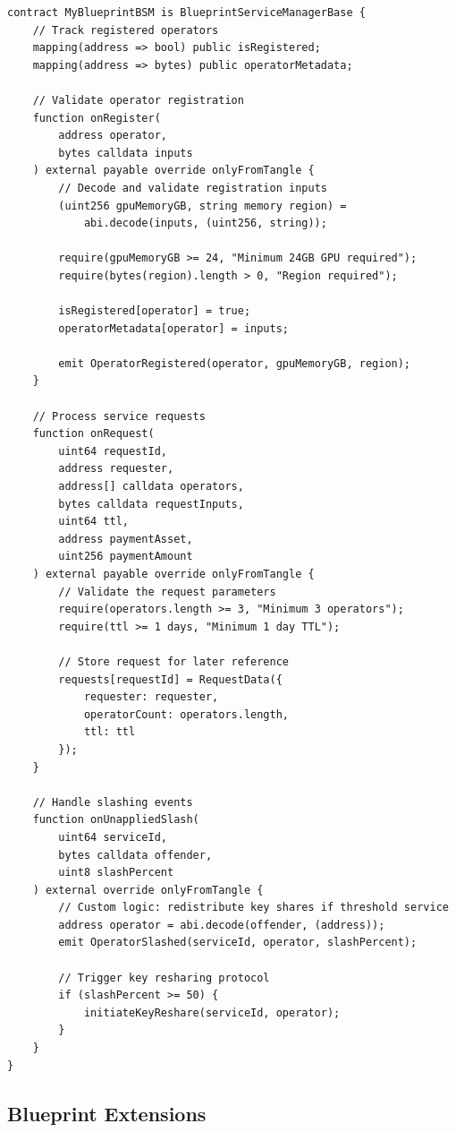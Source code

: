 \documentclass[11pt,a4paper]{article}
\begin{document}
\begin{lstlisting}[style=solidity]
contract MyBlueprintBSM is BlueprintServiceManagerBase {
    // Track registered operators
    mapping(address => bool) public isRegistered;
    mapping(address => bytes) public operatorMetadata;

    // Validate operator registration
    function onRegister(
        address operator,
        bytes calldata inputs
    ) external payable override onlyFromTangle {
        // Decode and validate registration inputs
        (uint256 gpuMemoryGB, string memory region) =
            abi.decode(inputs, (uint256, string));

        require(gpuMemoryGB >= 24, "Minimum 24GB GPU required");
        require(bytes(region).length > 0, "Region required");

        isRegistered[operator] = true;
        operatorMetadata[operator] = inputs;

        emit OperatorRegistered(operator, gpuMemoryGB, region);
    }

    // Process service requests
    function onRequest(
        uint64 requestId,
        address requester,
        address[] calldata operators,
        bytes calldata requestInputs,
        uint64 ttl,
        address paymentAsset,
        uint256 paymentAmount
    ) external payable override onlyFromTangle {
        // Validate the request parameters
        require(operators.length >= 3, "Minimum 3 operators");
        require(ttl >= 1 days, "Minimum 1 day TTL");

        // Store request for later reference
        requests[requestId] = RequestData({
            requester: requester,
            operatorCount: operators.length,
            ttl: ttl
        });
    }

    // Handle slashing events
    function onUnappliedSlash(
        uint64 serviceId,
        bytes calldata offender,
        uint8 slashPercent
    ) external override onlyFromTangle {
        // Custom logic: redistribute key shares if threshold service
        address operator = abi.decode(offender, (address));
        emit OperatorSlashed(serviceId, operator, slashPercent);

        // Trigger key resharing protocol
        if (slashPercent >= 50) {
            initiateKeyReshare(serviceId, operator);
        }
    }
}
\end{lstlisting}

\subsection{Blueprint Extensions}
\end{document}
